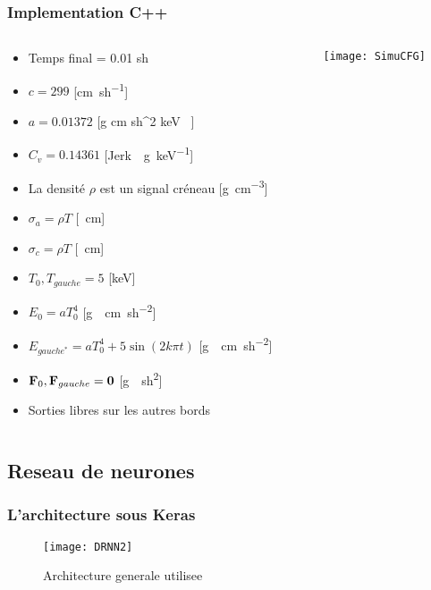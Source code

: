 \begin{frame}
  \frametitle{Implementation C++}
  \begin{columns}
    \begin{column}{0.6\textwidth}
      \scriptsize
      \begin{itemize}
        \item Temps final = 0.01 \si{sh} %
        \item $c = 299$ [\si{\cm \per sh}]
        \item $a = 0.01372$ [\si{g \per cm \per sh^2  \per keV }]
        \item $C_v = 0.14361$ [\si{Jerk \per\g \per keV}] %
        \item La densité $\rho$ est un signal créneau [\si{\g\per\cm\cubed}]
        \item $\sigma_a = \rho T$ [\si{\per\cm}]
        \item $\sigma_c = \rho T$ [\si{\per\cm}]
        \item $T_0, T_{gauche} = 5$ [\si{keV}] %
        \item $E_0 = aT_0^4$ [\si{g \per \cm \per sh^2}]
        \item $E_{gauche^*} = aT_{0}^4 + 5 \sin (2 k \pi t)$ [\si{g \per \cm \per sh^2}]
        \item $\mathbf{F}_0, \mathbf{F}_{gauche} = \mathbf{0}$ [\si{g \per sh^2}]
        \item Sorties libres sur les autres bords
      \end{itemize}
    \end{column}
    \begin{column}{0.4\textwidth}
        \texttt{[image: SimuCFG]}   %
    \end{column}
   \end{columns}
\end{frame}

\subsection{Reseau de neurones}

\begin{frame}
    \frametitle{L'architecture sous Keras}
    \begin{center}
        \begin{figure}
        \texttt{[image: DRNN2]}    %
        \caption{Architecture generale utilisee}
        \end{figure}
    \end{center}
\end{frame}

